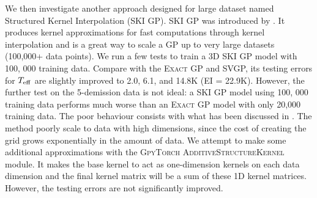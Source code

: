 We then investigate another approach designed for large dataset named Structured Kernel Interpolation (SKI GP). SKI GP was introduced by \citet{wilson2015kernel}. It produces kernel approximations for fast computations through kernel interpolation and is a great way to scale a GP up to very large datasets (100,000+ data points).
We run a few tests to train a 3D SKI GP model with 100, 000 training data. Compare with the \textsc{Exact GP} and SVGP, its testing errors for $T_{\rm eff}$ are slightly improved to 2.0, 6.1, and 14.8K (EI = 22.9K). However, the further test on the 5-demission data is not ideal: a SKI GP model using 100, 000 training data performs much worse than an \textsc{Exact GP} model with only 20,000 training data. The poor behaviour consists with what has been discussed in \citet{wilson2015kernel}. The method poorly scale to data with high dimensions, since the cost of creating the grid grows exponentially in the amount of data. We attempt to make some additional approximations with the \textsc{GpyTorch AdditiveStructureKernel} module. It makes the base kernel to act as one-dimension kernels on each data dimension and the final kernel matrix will be a sum of these 1D kernel matrices. However, the testing errors are not significantly improved.

